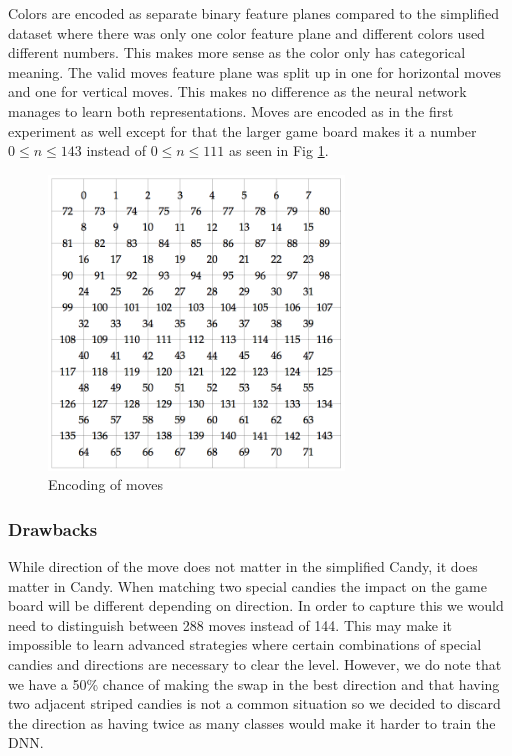 \documentclass{kththesis}
\begin{document}
Colors are encoded as separate binary feature planes compared to the simplified dataset  where there was only one color feature plane and different colors used different numbers. This makes more sense as the color only has categorical meaning. The valid moves feature plane was split up in one for horizontal moves and one for vertical moves. This makes no difference as the neural network manages to learn both representations. Moves are encoded as in the first experiment as well except for that the larger game board makes it a number $0\leq n \leq 143$ instead of  $0\leq n \leq 111$ as seen in Fig \ref{fig:move_encoding}.  

\begin{figure}[]
\centering
\includegraphics[width=0.7\textwidth]{images/encoding_big_moves.png}
\caption{Encoding of moves}
\label{fig:move_encoding}
\end{figure}

\subsubsection{Drawbacks}
While direction of the move does not matter in the simplified Candy, it does matter in Candy. When matching two special candies the impact on the game board will be different depending on direction. In order to capture this we would need to distinguish between 288 moves instead of 144. This may make it impossible to learn advanced strategies where certain combinations of special candies and directions are necessary to clear the level. However, we do note that we have a 50\% chance of making the swap in the best direction  and that having two adjacent striped candies is not a common situation so we decided to discard the direction as having twice as many classes would make it harder to train the DNN.
\end{document}
